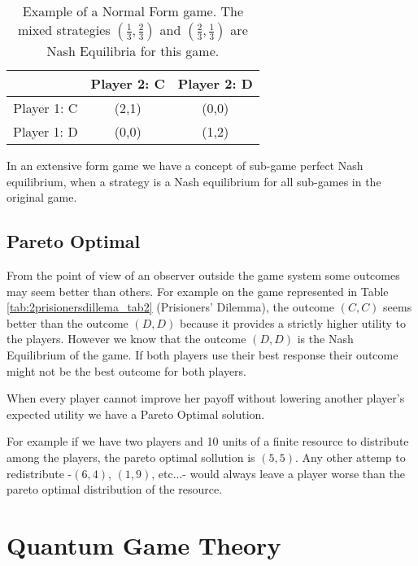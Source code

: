 \begin{center}
\begin{table}[h]
\begin{centering}
\begin{tabular}{ccc}
\hline 
 & Player 2: C & Player 2: D\tabularnewline
\hline 
Player 1: C & (2,1) & (0,0)\tabularnewline
Player 1: D & (0,0) & (1,2)\tabularnewline
\hline 
\end{tabular}
\par\end{centering}

\caption{Example of a Normal Form game. The mixed strategies $(\frac{1}{3} , \frac{2}{3})$ and $(\frac{2}{3} , \frac{1}{3})$ are Nash Equilibria for this game. }
\label{tab:2pennyflip_tab2}
\end{table}
\par\end{center}


In an extensive form game we have a concept of sub-game perfect Nash equilibrium, when a strategy is a Nash equilibrium for all sub-games in the original game\cite{Leyton-Brown2008:Essentials_Game_Theory}.

\subsection{Pareto Optimal}
\label{subsec:background:game_theory_pareto_optimal}

From the point of view of an observer outside the game system some outcomes may seem better than others. For example on the game represented in Table \ref{tab:2prisionersdillema_tab2} (Prisioners' Dilemma), the outcome $(C,C)$ seems better than the outcome $(D,D)$ because it provides a strictly higher utility to the players. However we know that the outcome $(D,D)$ is the Nash Equilibrium of the game. If both players use their best response their outcome might not be the best outcome for both players.

When every player cannot improve her payoff without lowering another player's expected utility we have a Pareto Optimal solution.

For example if we have two players and 10 units of a finite resource to distribute among the players, the pareto optimal sollution is $(5,5)$. Any other attemp to redistribute -$(6,4)$, $(1,9)$, etc...- would always leave a player worse than the pareto optimal distribution of the resource.


\clearpage
\section{Quantum Game Theory}
\label{sec:background_quantum_game_theory}



